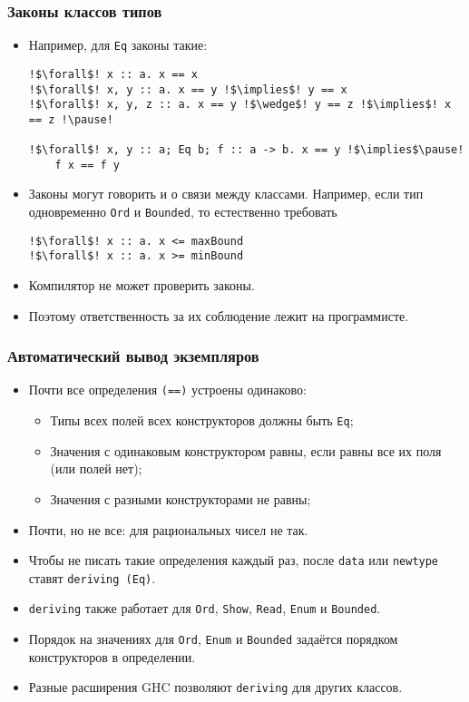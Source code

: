 \documentclass[10pt]{beamer}
\begin{document}
\begin{frame}[fragile]
  \frametitle{Законы классов типов}
  \begin{itemize}
    \item Например, для \lstinline|Eq| законы такие:\pause
          \begin{lstlisting}
!$\forall$! x :: a. x == x
!$\forall$! x, y :: a. x == y !$\implies$! y == x
!$\forall$! x, y, z :: a. x == y !$\wedge$! y == z !$\implies$! x == z !\pause!

!$\forall$! x, y :: a; Eq b; f :: a -> b. x == y !$\implies$\pause! 
    f x == f y
\end{lstlisting}\pause
    \item Законы могут говорить и о связи между классами. Например, если тип одновременно \lstinline|Ord| и \lstinline|Bounded|, то естественно требовать
          \begin{lstlisting}
!$\forall$! x :: a. x <= maxBound
!$\forall$! x :: a. x >= minBound
\end{lstlisting}
          \pause
    \item Компилятор не может проверить законы.
    \item Поэтому ответственность за их соблюдение лежит на программисте.
  \end{itemize}
\end{frame}

\begin{frame}[fragile]
  \frametitle{Автоматический вывод экземпляров}
  \begin{itemize}
    \item Почти все определения \lstinline|(==)| устроены одинаково:\pause
          \begin{itemize}
            \item Типы всех полей всех конструкторов должны быть \lstinline|Eq|;
            \item Значения с одинаковым конструктором равны, если равны все их поля (или полей нет);
            \item Значения с разными конструкторами не равны;
          \end{itemize}
    \item Почти, но не все: \pause для рациональных чисел не так.\pause
    \item Чтобы не писать такие определения каждый раз, после \lstinline|data| или \lstinline|newtype| ставят \lstinline|deriving (Eq)|.
    \item \lstinline|deriving| также работает для \lstinline|Ord|, \lstinline|Show|, \lstinline|Read|, \lstinline|Enum| и \lstinline|Bounded|.
    \item Порядок на значениях для \lstinline|Ord|, \lstinline|Enum| и \lstinline|Bounded| задаётся порядком конструкторов в определении.\pause
    \item Разные расширения GHC позволяют \lstinline|deriving| для других классов.
  \end{itemize}
\end{frame}
\end{document}
